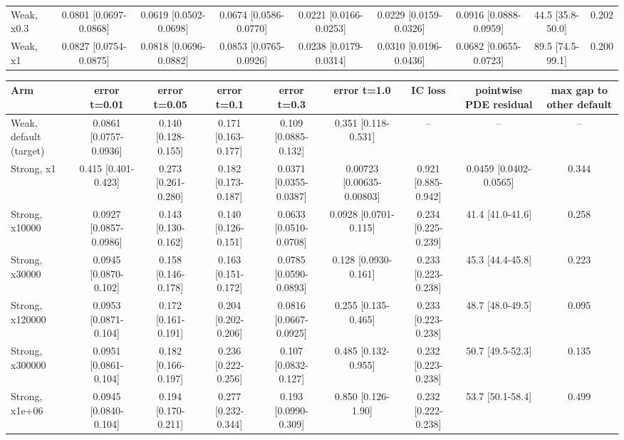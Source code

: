 \begin{tabular}{lcccccccc}
Weak, x0.3 & 0.0801 {\scriptsize[0.0697-0.0868]} & 0.0619 {\scriptsize[0.0502-0.0698]} & 0.0674 {\scriptsize[0.0586-0.0770]} & 0.0221 {\scriptsize[0.0166-0.0253]} & 0.0229 {\scriptsize[0.0159-0.0326]} & 0.0916 {\scriptsize[0.0888-0.0959]} & 44.5 {\scriptsize[35.8-50.0]} & 0.202 \\
Weak, x1 & 0.0827 {\scriptsize[0.0754-0.0875]} & 0.0818 {\scriptsize[0.0696-0.0882]} & 0.0853 {\scriptsize[0.0765-0.0926]} & 0.0238 {\scriptsize[0.0179-0.0314]} & 0.0310 {\scriptsize[0.0196-0.0436]} & 0.0682 {\scriptsize[0.0655-0.0723]} & 89.5 {\scriptsize[74.5-99.1]} & 0.200 \\
\bottomrule
\end{tabular}

\begin{tabular}{lcccccccc}
\toprule
Arm & error t=0.01 & error t=0.05 & error t=0.1 & error t=0.3 & error t=1.0 & IC loss & pointwise PDE residual & max gap to other default \\
\midrule
Weak, default (target) & 0.0861 {\scriptsize[0.0757-0.0936]} & 0.140 {\scriptsize[0.128-0.155]} & 0.171 {\scriptsize[0.163-0.177]} & 0.109 {\scriptsize[0.0885-0.132]} & 0.351 {\scriptsize[0.118-0.531]} & -- & -- & -- \\
Strong, x1 & 0.415 {\scriptsize[0.401-0.423]} & 0.273 {\scriptsize[0.261-0.280]} & 0.182 {\scriptsize[0.173-0.187]} & 0.0371 {\scriptsize[0.0355-0.0387]} & 0.00723 {\scriptsize[0.00635-0.00803]} & 0.921 {\scriptsize[0.885-0.942]} & 0.0459 {\scriptsize[0.0402-0.0565]} & 0.344 \\
Strong, x10000 & 0.0927 {\scriptsize[0.0857-0.0986]} & 0.143 {\scriptsize[0.130-0.162]} & 0.140 {\scriptsize[0.126-0.151]} & 0.0633 {\scriptsize[0.0510-0.0708]} & 0.0928 {\scriptsize[0.0701-0.115]} & 0.234 {\scriptsize[0.225-0.239]} & 41.4 {\scriptsize[41.0-41.6]} & 0.258 \\
Strong, x30000 & 0.0945 {\scriptsize[0.0870-0.102]} & 0.158 {\scriptsize[0.146-0.178]} & 0.163 {\scriptsize[0.151-0.172]} & 0.0785 {\scriptsize[0.0590-0.0893]} & 0.128 {\scriptsize[0.0930-0.161]} & 0.233 {\scriptsize[0.223-0.238]} & 45.3 {\scriptsize[44.4-45.8]} & 0.223 \\
Strong, x120000 & 0.0953 {\scriptsize[0.0871-0.104]} & 0.172 {\scriptsize[0.161-0.191]} & 0.204 {\scriptsize[0.202-0.206]} & 0.0816 {\scriptsize[0.0667-0.0925]} & 0.255 {\scriptsize[0.135-0.465]} & 0.233 {\scriptsize[0.223-0.238]} & 48.7 {\scriptsize[48.0-49.5]} & 0.095 \\
Strong, x300000 & 0.0951 {\scriptsize[0.0861-0.104]} & 0.182 {\scriptsize[0.166-0.197]} & 0.236 {\scriptsize[0.222-0.256]} & 0.107 {\scriptsize[0.0832-0.127]} & 0.485 {\scriptsize[0.132-0.955]} & 0.232 {\scriptsize[0.223-0.238]} & 50.7 {\scriptsize[49.5-52.3]} & 0.135 \\
Strong, x1e+06 & 0.0945 {\scriptsize[0.0840-0.104]} & 0.194 {\scriptsize[0.170-0.211]} & 0.277 {\scriptsize[0.232-0.344]} & 0.193 {\scriptsize[0.0990-0.309]} & 0.850 {\scriptsize[0.126-1.90]} & 0.232 {\scriptsize[0.222-0.238]} & 53.7 {\scriptsize[50.1-58.4]} & 0.499 \\
\bottomrule
\end{tabular}


